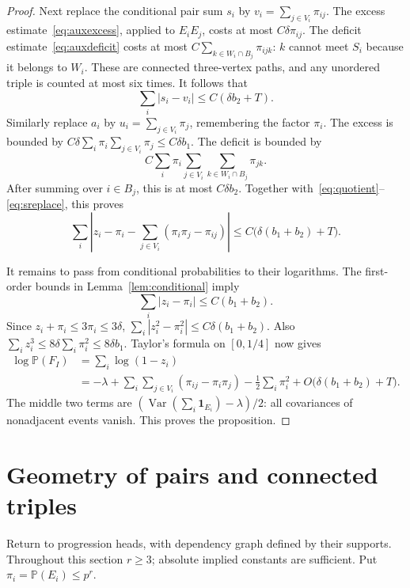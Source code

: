 \documentclass[11pt]{article}
\theoremstyle{definition}\newtheorem{definition}[theorem]{Definition}
\theoremstyle{remark}\newtheorem{remark}[theorem]{Remark}
\newcommand{\PP}{\mathbb P}
\newcommand{\Var}{\operatorname{Var}}
\newcommand{\ind}{\mathbf 1}
\newcommand{\la}{\lambda}
\begin{document}
\begin{proof}
Next replace the conditional pair sum $s_i$ by
$v_i=\sum_{j\in V_i}\pi_{ij}$.
The excess estimate~\eqref{eq:auxexcess}, applied to $E_iE_j$, costs at
most $C\delta\pi_{ij}$. The deficit estimate~\eqref{eq:auxdeficit}
costs at most $C\sum_{k\in W_i\cap B_j}\pi_{ijk}$:
$k$ cannot meet $S_i$ because it belongs to $W_i$. These are connected
three-vertex paths, and any unordered triple is counted at most six times.
It follows that
\begin{equation}
 \sum_i|s_i-v_i|\le C(\delta b_2+T).\label{eq:sreplace}
\end{equation}
Similarly replace $a_i$ by $u_i=\sum_{j\in V_i}\pi_j$, remembering the
factor $\pi_i$. The excess is bounded by
$C\delta\sum_i\pi_i\sum_{j\in V_i}\pi_j\le C\delta b_1$.
The deficit is bounded by
\[
 C\sum_i\pi_i\sum_{j\in V_i}\sum_{k\in W_i\cap B_j}\pi_{jk}.
\]
After summing over $i\in B_j$, this is at most $C\delta b_2$.
Together with~\eqref{eq:quotient}--\eqref{eq:sreplace}, this proves
\begin{equation}
 \sum_i\left|z_i-\pi_i-
       \sum_{j\in V_i}(\pi_i\pi_j-\pi_{ij})\right|
 \le C\bigl(\delta(b_1+b_2)+T\bigr).
 \label{eq:zexpansion}
\end{equation}

It remains to pass from conditional probabilities to their logarithms.
The first-order bounds in Lemma~\ref{lem:conditional} imply
\[
 \sum_i|z_i-\pi_i|\le C(b_1+b_2).
\]
Since $z_i+\pi_i\le3\pi_i\le3\delta$,
$\sum_i|z_i^2-\pi_i^2|\le C\delta(b_1+b_2)$.
Also $\sum_i z_i^3\le8\delta\sum_i\pi_i^2\le8\delta b_1$.
Taylor's formula on $[0,1/4]$ now gives
\begin{align*}
 \log\PP(F_I)
 &=\sum_i\log(1-z_i)\\
 &=-\la+\sum_{i}\sum_{j\in V_i}(\pi_{ij}-\pi_i\pi_j)
       -\frac12\sum_i\pi_i^2
       +O\bigl(\delta(b_1+b_2)+T\bigr).
\end{align*}
The middle two terms are $(\Var(\sum_i\ind_{E_i})-\la)/2$:
all covariances of nonadjacent events vanish. This proves the proposition.
\end{proof}

\section{Geometry of pairs and connected triples}\label{sec:geometry}
Return to progression heads, with dependency graph defined by their
supports. Throughout this section $r\ge3$; absolute implied constants
are sufficient. Put $\pi_i=\PP(E_i)\le p^r$.
\end{document}
